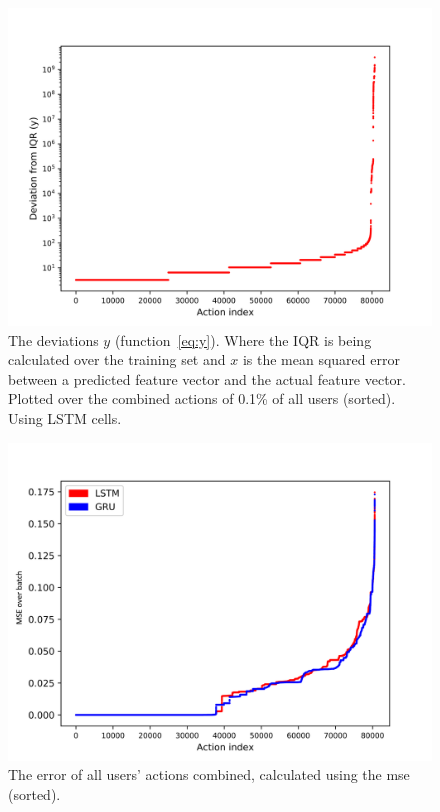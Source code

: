 \begin{figure}
	\begin{center}
		\includegraphics[scale=6.0]{experiments/cell/deviations/lstm}
	\end{center}
	\caption{The deviations \(y\) (function~\ref{eq:y}). Where the IQR is being calculated over the training set and \(x\) is the mean squared error between a predicted feature vector and the actual feature vector. Plotted over the combined actions of 0.1\% of all users (sorted). Using LSTM cells.~\label{fig:lstm_deviations}}
\end{figure}

\begin{figure}
	\begin{center}
		\includegraphics[scale=6.0]{experiments/cell/losses/comparison}
	\end{center}
	\caption{The error of all users' actions combined, calculated using the mse (sorted).~\label{fig:gru_rnn_losses}}
\end{figure}

